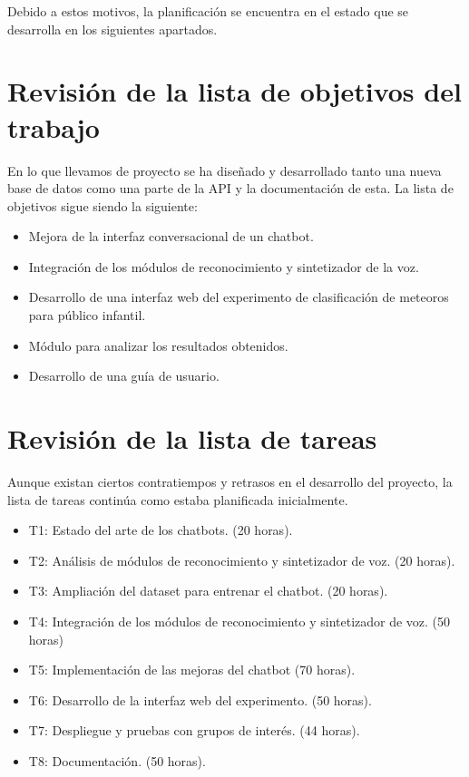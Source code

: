 Debido a estos motivos, la planificación se encuentra en el estado que se desarrolla en los siguientes apartados.
\vspace{1cm}
\section*{Revisión de la lista de objetivos del trabajo}

En lo que llevamos de proyecto se ha diseñado y desarrollado tanto una nueva base de datos como una parte de la API y la documentación de esta. La lista de objetivos sigue siendo la siguiente: 
\begin{itemize}
    \item Mejora de la interfaz conversacional de un chatbot.
    \item Integración de los módulos de reconocimiento y sintetizador de la voz.
    \item Desarrollo de una interfaz web del experimento de clasificación de meteoros para público infantil.
    \item Módulo para analizar los resultados obtenidos.
    \item Desarrollo de una guía de usuario.
\end{itemize}
\vspace{1cm}
\section*{Revisión de la lista de tareas}

Aunque existan ciertos contratiempos y retrasos en el desarrollo del proyecto, la lista de tareas continúa como estaba planificada inicialmente.

\begin{itemize}
    \item T1: Estado del arte de los chatbots. (20 horas).
    \item T2: Análisis de módulos de reconocimiento y sintetizador de voz. (20 horas).
    \item T3: Ampliación del dataset para entrenar el chatbot. (20 horas).
    \item T4: Integración de los módulos de reconocimiento y sintetizador de voz. (50 horas)
    \item T5: Implementación de las mejoras del chatbot (70 horas).
    \item T6: Desarrollo de la interfaz web del experimento. (50 horas).
    \item T7: Despliegue y pruebas con grupos de interés. (44 horas).
    \item T8: Documentación. (50 horas).
\end{itemize}

